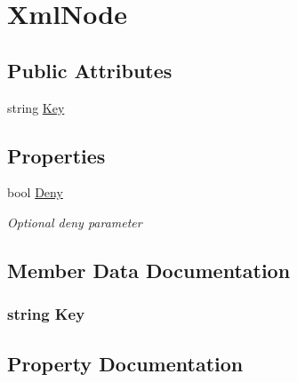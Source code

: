 \hypertarget{classOTA_1_1Permissions_1_1XmlNode}{}\section{Xml\+Node}
\label{classOTA_1_1Permissions_1_1XmlNode}
\subsection*{Public Attributes}
\begin{DoxyCompactItemize}
\item 
string \hyperlink{classOTA_1_1Permissions_1_1XmlNode_a67259580f3bed3976cf28dea92a19d30}{Key}
\end{DoxyCompactItemize}
\subsection*{Properties}
\begin{DoxyCompactItemize}
\item 
bool \hyperlink{classOTA_1_1Permissions_1_1XmlNode_a5955d5846b0f297efe1d830d1b854279}{Deny}
\begin{DoxyCompactList}\small\item\em Optional deny parameter \end{DoxyCompactList}\end{DoxyCompactItemize}


\subsection{Member Data Documentation}
\hypertarget{classOTA_1_1Permissions_1_1XmlNode_a67259580f3bed3976cf28dea92a19d30}{}
\subsubsection[{Key}]{\setlength{\rightskip}{0pt plus 5cm}string Key}\label{classOTA_1_1Permissions_1_1XmlNode_a67259580f3bed3976cf28dea92a19d30}


\subsection{Property Documentation}
\hypertarget{classOTA_1_1Permissions_1_1XmlNode_a5955d5846b0f297efe1d830d1b854279}{}
